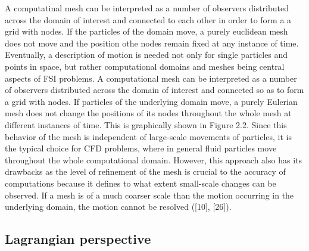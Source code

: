 A computatinal mesh can be interpreted as a number of observers distributed across the domain of interest and connected to each other in order to form a a grid with nodes. If the particles of the domain move, a purely euclidean mesh does not move and the position othe nodes remain fixed at any instance of time. 
Eventually, a description of motion is needed not only for single particles and points in space, but rather
computational domains and meshes being central aspects of FSI problems. A computational mesh can be
interpreted as a number of observers distributed across the domain of interest and connected so as to form
a grid with nodes. If particles of the underlying domain move, a purely Eulerian mesh does not change
the positions of its nodes throughout the whole mesh at different instances of time. This is graphically
shown in Figure 2.2. Since this behavior of the mesh is independent of large-scale movements of particles,
it is the typical choice for CFD problems, where in general fluid particles move throughout the whole
computational domain. However, this approach also has its drawbacks as the level of refinement of the
mesh is crucial to the accuracy of computations because it defines to what extent small-scale changes can
be observed. If a mesh is of a much coarser scale than the motion occurring in the underlying domain,
the motion cannot be resolved ([10], [26]).

\subsection{Lagrangian perspective}
\label{subsec:lagrange}

